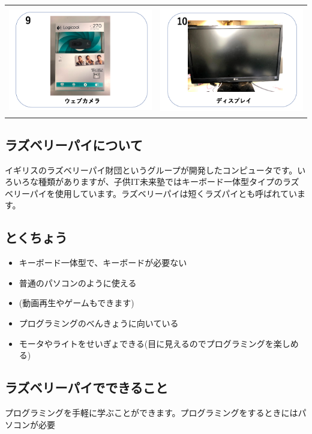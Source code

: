 \documentclass[a4paper,12pt]{jarticle}
\begin{document}
\begin{tabular}{cc}
  \includegraphics[width=6.488cm,height=4.697cm]{textbook-img002.png}
   &
  \includegraphics[width=6.488cm,height=4.697cm]{textbook-img001.png} \\
\end{tabular}

\subsection{ラズベリーパイについて}
イギリスのラズベリーパイ財団というグループが開発したコンピュータです。いろいろな種類がありますが、子供IT未来塾ではキーボード一体型タイプのラズベリーパイを使用しています。ラズベリーパイは短くラズパイとも呼ばれています。

\subsection{とくちょう}
\begin{itemize}
  \item キーボード一体型で、キーボードが必要ない
  \item 普通のパソコンのように使える
  \item (動画再生やゲームもできます)
  \item
        プログラミングのべんきょうに向いている
  \item
        モータやライトをせいぎょできる(目に見えるのでプログラミングを楽しめる)
\end{itemize}
\subsection{ラズベリーパイでできること}
プログラミングを手軽に学ぶことができます。プログラミングをするときにはパソコンが必要
\end{document}
